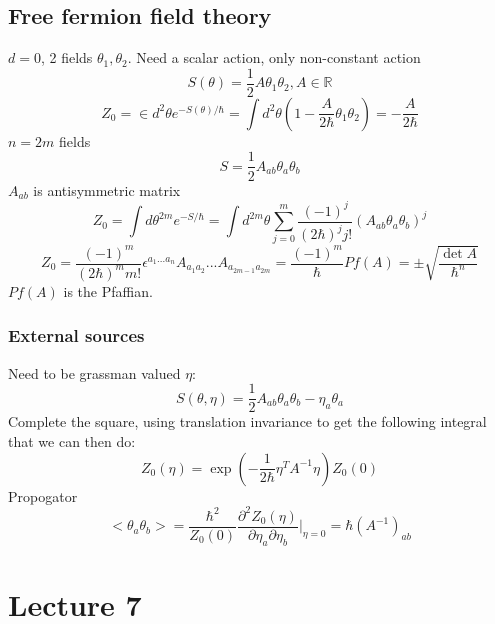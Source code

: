\documentclass{article}
\begin{document}
\subsection{Free fermion field theory}
$d = 0$, 2 fields $\theta_1, \theta_2$. Need a scalar action, only non-constant action
$$
S(\theta) = \frac{1}{2} A \theta_1 \theta_2, A \in \mathbb{R}
$$
$$
Z_0 = \in d^2 \theta e^{-S(\theta)/\hbar} = \int d^2 \theta ( 1- \frac{A}{2\hbar} \theta_1 \theta_2) = - \frac{A}{2 \hbar}
$$
$n = 2m$ fields
$$
S= \frac{1}{2} A_{ab} \theta_a \theta_b
$$
$ A_{ab}$ is antisymmetric matrix
$$
Z_{0} = \int d\theta^{2m} e^{-S /\hbar} = \int d^{2m} \theta \sum_{j=0}^m \frac{(-1)^j}{(2\hbar)^j j!} ( A_{ab} \theta_a \theta_b)^j
$$
$$
Z_0 = \frac{(-1)^m}{(2\hbar)^m m!} \epsilon^{a_1...a_n} A_{a_1a_2} ... A_{a_{2m-1} a_{2m}} = \frac{(-1)^m}{\hbar} Pf(A) = \pm \sqrt{\frac{\det A}{\hbar^n}}
$$
$Pf(A)$ is the Pfaffian.
\subsubsection{External sources}
Need to be grassman valued $\eta$:
$$
S(\theta, \eta) = \frac{1}{2} A_{ab} \theta_a \theta_b - \eta_a \theta_a
$$
Complete the square, using translation invariance to get the following integral that we can then do:
$$
Z_0(\eta) = \exp( - \frac{1}{2\hbar} \eta^{T} A^{-1} \eta) Z_0(0)
$$
Propogator
$$
< \theta_a \theta_b> = \frac{\hbar^2}{Z_0(0)} \frac{\partial^2 Z_0(\eta)}{\partial \eta_a \partial \eta_b}|_{\eta=0} = \hbar ( A^{-1})_{ab}
$$
\section{Lecture 7}
\end{document}
